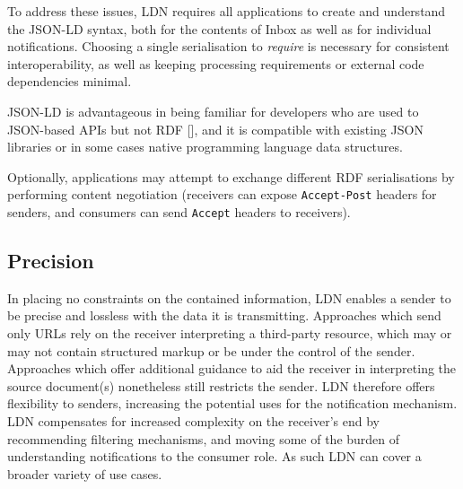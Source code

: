 \documentclass[a4paper]{llncs}
\begin{document}
                                        To address these issues, LDN requires all applications to create and understand the JSON-LD syntax, both for the contents of Inbox as well as for individual notifications. Choosing a single serialisation to {\em require} is necessary for consistent interoperability, as well as keeping processing requirements or external code dependencies minimal.

                                        JSON-LD is advantageous in being familiar for developers who are \empty used to JSON-based APIs but not RDF [], and it is compatible with existing JSON libraries or in some cases native programming language data structures.
                                    

                                    
\par Optionally, applications may attempt to exchange different RDF serialisations by performing content negotiation (receivers can expose {\tt Accept-Post} headers for senders, and consumers can send {\tt Accept} headers to receivers).
                                
                            

                            
                                \subsection{Precision}
  \label{precision}

                                
                                    
\par In placing no constraints on the contained information, LDN enables a sender to be precise and lossless with the data it is transmitting. Approaches which send only URLs rely on the receiver interpreting a third-party resource, which may or may not contain structured markup or be under the control of the sender. Approaches which offer additional guidance to aid the receiver in interpreting the source document(s) nonetheless still restricts the sender. LDN therefore offers flexibility to senders, increasing the potential uses for the notification mechanism. LDN compensates for increased complexity on the receiver’s end by recommending filtering mechanisms, and moving some of the burden of understanding notifications to the consumer role. As such LDN can cover a broader variety of use cases.
                                
\end{document}

